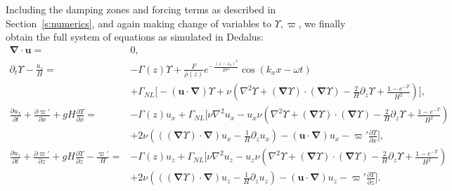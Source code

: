 \documentclass[
        fleqn,
        usenatbib,
    ]{mnras}
\newcommand*{\pd}[2]{\frac{\partial#1}{\partial#2}}
\newcommand*{\p}[1]{\left(#1\right)}
\newcommand*{\bm}[1]{\mathbf{#1}}
\begin{document}
Including the damping zones and forcing terms as described in
Section~\ref{s:numerics}, and again making change of variables to $\Upsilon,
\varpi$, we finally obtain the full system of equations as simulated in Dedalus:
\begin{subequations}\label{se:dedalus_eqs}
    \begin{align}
        \bm{\nabla} \cdot \bm{u} ={}& 0,\\
        \partial_t \Upsilon - \frac{u_z}{H}
            ={}& -\Gamma(z) \Upsilon
                + \frac{F}{\overline{\rho}(z)}e^{-\frac{(z - z_0)^2}{2\sigma^2}}
                    \cos \p{k_xx - \omega t}\nonumber\\
            & + \Gamma_{NL} \bigg[-\p{\bm{u} \cdot \bm{\nabla}}\Upsilon
                + \nu\p{\nabla^2 \Upsilon + \p{
                    \bm{\nabla} \Upsilon} \cdot \p{\bm{\nabla}\Upsilon}
                    - \frac{2}{H}\partial_z \Upsilon
                    + \frac{1 - e^{-\Upsilon}}{H^2}}\bigg],\\
        \pd{u_x}{t} + \pd{\varpi'}{x} + gH\pd{\Upsilon}{x} ={}&
            -\Gamma(z) u_x
            + \Gamma_{NL}\bigg[\nu \nabla^2 u_x
            - u_x \nu\p{\nabla^2 \Upsilon + \p{\bm{\nabla} \Upsilon} \cdot
                \p{\bm{\nabla}\Upsilon} - \frac{2}{H}\partial_z \Upsilon
                + \frac{1 - e^{-\Upsilon}}{H^2}}\nonumber\\
            &+ 2\nu \p{\p{\p{\bm{\nabla}\Upsilon} \cdot \bm{\nabla}}u_x
                - \frac{1}{H}\partial_z u_x}
                - \p{\bm{u} \cdot \bm{\nabla}}u_x
                - \varpi' \pd{\Upsilon}{x}\bigg],\\
        \pd{u_z}{t} + \pd{\varpi'}{z} + gH\pd{\Upsilon}{z} - \frac{\varpi'}{H}
            ={}& -\Gamma(z) u_z
            +\Gamma_{NL}\bigg[\nu \nabla^2 u_z
            - u_z \nu\p{\nabla^2 \Upsilon + \p{\bm{\nabla} \Upsilon} \cdot
                \p{\bm{\nabla}\Upsilon} - \frac{2}{H}\partial_z \Upsilon
                + \frac{1 - e^{-\Upsilon}}{H^2}}\nonumber\\
            &+ 2\nu \p{\p{\p{\bm{\nabla}\Upsilon} \cdot \bm{\nabla}}u_z -
                \frac{1}{H}\partial_z u_{z}}
            - \p{\bm{u} \cdot \bm{\nabla}}u_z
            - \varpi' \pd{\Upsilon}{z}\bigg].
    \end{align}
\end{subequations}
\label{lastpage} %
\end{document}
